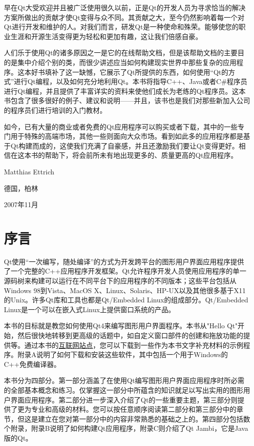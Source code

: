 \documentclass[11pt,oneside]{book}
\begin{document}
\begin{common-format}
早在Qt大受欢迎并且被广泛使用很久以前，正是Qt的开发人员为寻求恰当的解决方案所做出的贡献才使Qt变得与众不同。其贡献之大，至今仍然影响着每一个对Qt进行开发和维护的人。对我们而言，研发Qt是一种使命和殊荣。能够使您的职业生涯和开源生活变得更为轻松和更加有趣，这让我们倍感自豪。

人们乐于使用Qt的诸多原因之一是它的在线帮助文档，但是该帮助文档的主要目的是集中介绍个别的类，而很少讲述应当如何构建现实世界中那些复杂的应用程序。这本好书填补了这一缺憾，它展示了Qt所提供的东西，如何使用“Qt的方式”进行Qt编程，以及如何充分地利用Qt。本书将指导C++、Java或者C\#{}程序员进行Qt编程，并且提供了丰富详实的资料来使他们成长为老练的Qt程序员。这本书包含了很多很好的例子、建议和说明——并且，该书也是我们对那些新加入公司的程序员们进行培训的入门教材。

如今，已有大量的商业或者免费的Qt应用程序可以购买或者下载，其中的一些专门用于特殊的高端市场，其他一些则面向大众市场。看到如此多的应用程序都是基于Qt构建而成的，这使我们充满了自豪感，并且还激励我们要让Qt变得更好。相信在这本书的帮助下，将会前所未有地出现更多的、质量更高的Qt应用程序。

{\hfill Matthias Ettrich}

{\hfill 德国，柏林}

{\hfill 2007年11月}

\section*{序言}
Qt使用“一次编写，随处编译”的方式为开发跨平台的图形用户界面应用程序提供了一个完整的C++应用程序开发框架。Qt允许程序开发人员使用应用程序的单一源码树来构建可以运行在不同平台下的应用程序的不同版本；这些平台包括从Windows 98到Vista、MacOS X、Linux、Solaris、HP-UX以及其他很多基于X11的Unix。许多Qt库和工具也都是Qt/Embedded Linux的组成部分。Qt/Embedded Linux是一个可以在嵌入式Linux上提供窗口系统的产品。

本书的目标就是教您如何使用Qt4来编写图形用户界面程序。本书从"Hello Qt"开始，然后很快地转移到更高级的话题中，如自定义窗口部件的创建和拖放功能的提供等。通过本书的\href{http://www.informit.com/store/c-plus-plus-gui-programming-with-qt4-9780132354165}{互联网站点}，您可以下载到一些作为本书文字补充材料的示例程序。附录A说明了如何下载和安装这些软件，其中包括一个用于Windows的C++免费编译器。

本书分为四部分。第一部分涵盖了在使用Qt编写图形用户界面应用程序时所必需的全部基本概念和练习。仅掌握这一部分中所蕴含的知识就足以写出实用的图形用户界面应用程序。第二部分进一步深入介绍了Qt的一些重要主题，第三部分则提供了更为专业和高级的材料。您可以按任意顺序阅读第二部分和第三部分中的章节，但这是建立在您对第一部分中的内容非常熟悉的基础之上的。第四部分包括数个附录，附录B说明了如何构建Qt应用程序，附录C则介绍了Qt Jambi，它是Java版的Qt。


\end{common-format}
\end{document}
